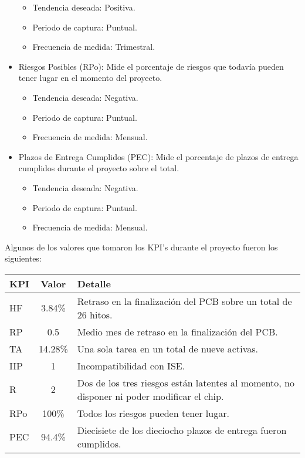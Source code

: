 \begin{itemize}
\begin{itemize}
    	\item Tendencia deseada: Positiva.
		\item Periodo de captura: Puntual.
		\item Frecuencia de medida: Trimestral.
	\end{itemize}
\item Riesgos Posibles (RPo): Mide el porcentaje de riesgos que todavía pueden tener lugar en el momento del proyecto.
	\begin{itemize}
    	\item Tendencia deseada: Negativa.
		\item Periodo de captura: Puntual.
		\item Frecuencia de medida: Mensual.
	\end{itemize}
\item Plazos de Entrega Cumplidos (PEC): Mide el porcentaje de plazos de entrega cumplidos durante el proyecto sobre el total.
	\begin{itemize}
    	\item Tendencia deseada: Negativa.
		\item Periodo de captura: Puntual.
		\item Frecuencia de medida: Mensual.
	\end{itemize}
\end{itemize}

Algunos de los valores que tomaron los KPI's durante el proyecto fueron los siguientes:

\begin{center}
  \begin{tabular}{ | l | c | l |}
    \hline
    KPI & Valor & Detalle \\ \hline
    HF & 3.84\% & Retraso en la finalización del PCB sobre un total de 26 hitos.\\ \hline
    RP & 0.5 &  Medio mes de retraso en la finalización del PCB.\\ \hline
    TA & 14.28\% & Una sola tarea en un total de nueve activas. \\ \hline
	IIP & 1  & Incompatibilidad con ISE. \\ \hline
	R & 2  & Dos de los tres riesgos están latentes al momento, no disponer ni poder modificar el chip.\\ \hline
	RPo & 100\% & Todos los riesgos pueden tener lugar. \\  \hline
    PEC & 94.4\% & Diecisiete de los dieciocho plazos de entrega fueron cumplidos. \\
    \hline
  \end{tabular}
\end{center}


